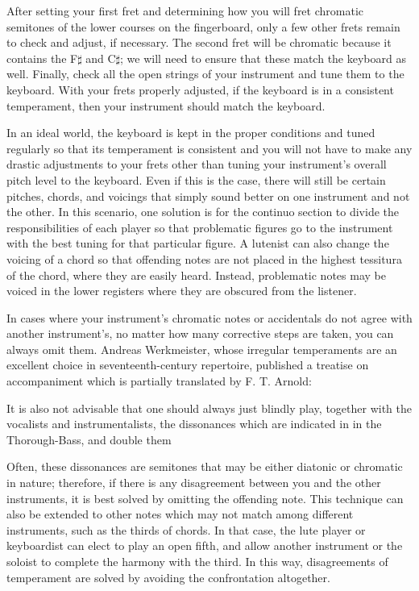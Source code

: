 After setting your first fret and determining how you will fret chromatic semitones of the lower
courses on the fingerboard, only a few other frets remain to check and adjust, if necessary.  The
second fret will be chromatic because it contains the F$\sharp$ and C$\sharp$; we will need to
ensure that these match the keyboard as well. Finally, check all the open strings of your instrument
and tune them to the keyboard. With your frets properly adjusted, if the keyboard is in a consistent
temperament, then your instrument should match the keyboard.

In an ideal world, the keyboard is kept in the proper conditions and tuned regularly so that its
temperament is consistent and you will not have to make any drastic adjustments to your frets other
than tuning your instrument's overall pitch level to the keyboard. Even if this is the case, there
will still be certain pitches, chords, and voicings that simply sound better on one instrument and
not the other.  In this scenario, one solution is for the continuo section to divide the
responsibilities of each player so that problematic figures go to the instrument with the best
tuning for that particular figure.  A lutenist can also change the voicing of a chord so that
offending notes are not placed in the highest tessitura of the chord, where they are easily heard.
Instead, problematic notes may be voiced in the lower registers where they are obscured from the
listener.

In cases where your instrument's chromatic notes or accidentals do not agree with another
instrument's, no matter how many corrective steps are taken, you can always omit them. Andreas
Werkmeister, whose irregular temperaments are an excellent choice in seventeenth-century repertoire,
published a treatise on accompaniment which is partially translated by F. T. Arnold:
\begin{blocks}
It is also not advisable that one should always just blindly play, together with the vocalists
and instrumentalists, the dissonances which are indicated in in the Thorough-Bass, and double
them
\autocite[210]{FTA:1}
\end{blocks}
Often, these dissonances are semitones that may be either diatonic or chromatic
in nature; therefore, if there is any disagreement between you and the other
instruments, it is best solved by omitting the offending note. This technique
can also be extended to other notes which may not match among different
instruments, such as the thirds of chords.  In that case, the lute player or
keyboardist can elect to play an open fifth, and allow another instrument or the
soloist to complete the harmony with the third.  In this way, disagreements of
temperament are solved by avoiding the confrontation altogether.

